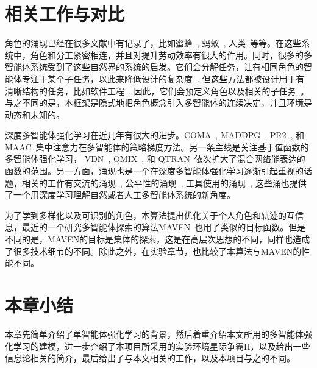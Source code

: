 \section{相关工作与对比}
角色的涌现已经在很多文献中有记录了，比如蜜蜂~\cite{jeanson2005emergence}, 蚂蚁~\cite{gordon1996organization}, 人类~\cite{butler2012condensed}等等。在这些系统中，角色和分工紧密相连，并且对提升劳动效率有很大的作用。同时，很多的多智能体系统受到了这些自然界的系统的启发。它们会分解任务，让有相同角色的智能体专注于某个子任务，以此来降低设计的复杂度~\cite{wooldridge2000gaia, omicini2000soda, padgham2002prometheus, pavon2003agent, cossentino2005passi, zhu2008role, spanoudakis2010using, deloach2010mase, bonjean2014adelfe}. 但这些方法都被设计用于有清晰结构的任务，比如软件工程~\cite{bresciani2004tropos}. 因此，它们会预定义角色以及相关的子任务~\cite{ Lhaksmana2018role}。与之不同的是，本框架是隐式地把角色概念引入多智能体的连续决定，并且环境是动态和未知的。

深度多智能体强化学习在近几年有很大的进步。COMA~\citep{foerster2018counterfactual}, MADDPG~\citep{lowe2017multi}, PR2~\citep{wen2019probabilistic}, 和MAAC~\cite{iqbal2019actor}集中注意力在多智能体的策略梯度方法。另一条主线是关注基于值函数的多智能体强化学习， VDN~\citep{sunehag2018value}, QMIX~\citep{rashid2018qmix}, 和 QTRAN~\citep{son2019qtran}依次扩大了混合网络能表达的函数的范围。另一方面，涌现也是一个在深度多智能体强化学习逐渐引起重视的话题，相关的工作有交流的涌现~\cite{foerster2016learning, lazaridou2017multi, das2017learning, mordatch2018emergence}, 公平性的涌现~\cite{jiang2019learning}, 工具使用的涌现~\cite{baker2020emergent}, 这些涌也提供了一个用深度学习理解自然或者人工多智能体系统的新角度。

为了学到多样化以及可识别的角色，本算法提出优化关于个人角色和轨迹的互信息，最近的一个研究多智能体探索的算法MAVEN~\cite{mahajan2019maven}也用了类似的目标函数。但是不同的是，MAVEN的目标是集体的探索，这是在高层次思想的不同，同样也造成了很多技术细节的不同。除此之外，在实验章节，也比较了本算法与MAVEN的性能不同。

\section{本章小结}
本章先简单介绍了单智能体强化学习的背景，然后着重介绍本文所用的多智能体强化学习的建模，进一步介绍了本项目所采用的实验环境星际争霸II，以及给出一些信息论相关的简介，最后给出了与本文相关的工作，以及本项目与之的不同。
